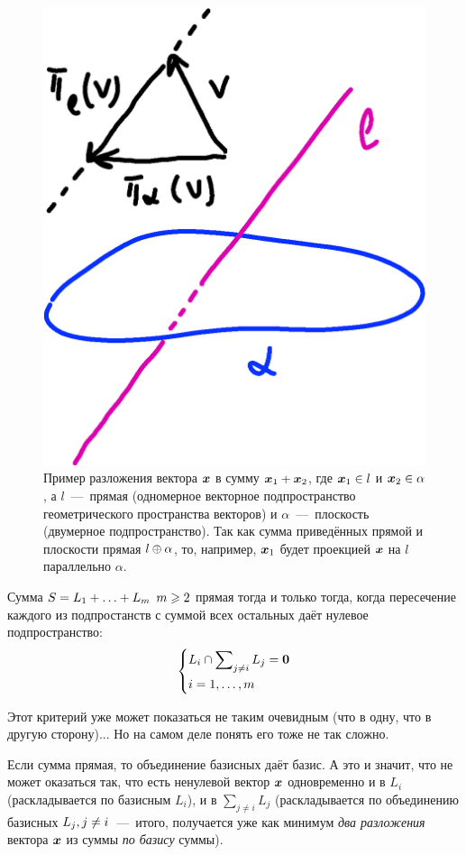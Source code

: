 \documentclass[a4paper,12pt]{article}
\begin{document}
  \begin{figure}[h]
    \centering
  
    \includegraphics[width=0.5\columnwidth]{projection}
  
    \caption{Пример разложения вектора $\boldsymbol x$ в сумму $\bds x_1 \hm+ \bds x_2$, где $\bds x_1 \hm\in l$ и $\bds x_2 \hm\in \alpha$, а $l$~---~прямая (одномерное векторное подпространство геометрического пространства векторов) и $\alpha$~---~плоскость (двумерное подпространство). Так как сумма приведённых прямой и плоскости прямая $l \hm\oplus \alpha$, то, например, $\boldsymbol x_1$ будет проекцией $\boldsymbol x$ на $l$ параллельно $\alpha$.}
    \label{fig:projection}
  \end{figure}
  
  \begin{proposition}
    Сумма $S \hm= L_1 \hm+ \ldots \hm+ L_m$ $m \hm\geq 2$ прямая тогда и только тогда, когда пересечение каждого из подпростанств с суммой всех остальных даёт нулевое подпространство:
    \begin{equation}\label{eq:li-cap-for-criterion2}
      \left\{
        \begin{aligned}
          &L_i \cap \sum\nolimits_{j \not= i} L_j = \bds 0\\
          &i \hm= 1, \ldots, m
        \end{aligned}
      \right.
    \end{equation}
  \end{proposition}
  
  Этот критерий уже может показаться не таким очевидным (что в одну, что в другую сторону)...
  Но на самом деле понять его тоже не так сложно.
  
  Если сумма прямая, то объединение базисных даёт базис.
  А это и значит, что не может оказаться так, что есть ненулевой вектор $\boldsymbol x$ одновременно и в $L_i$ (раскладывается по базисным $L_i$), и в $\sum_{j \not= i} L_j$ (раскладывается по объединению базисных $L_j, j \hm{\not=} i$~---~итого, получается уже как минимум \emph{два разложения} вектора $\boldsymbol x$ из суммы \emph{по базису} суммы).
  
\end{document}
